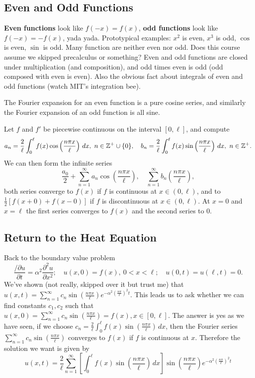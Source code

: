 \subsection{Even and Odd Functions}
\textbf{Even functions} look like $f(-x)=f(x)$, \textbf{odd functions} look like $f(-x)=-f(x)$, yada yada. Prototypical examples: $x^2$ is even, $x^3$ is odd, $\cos$ is even, $\sin$ is odd. Many function are neither even nor odd. Does this course assume we skipped precalculus or something? Even and odd functions are closed under multiplication (and composition), and odd times even is odd (odd composed with even is even). Also the obvious fact about integrals of even and odd functions (watch MIT's integration bee).
\begin{lemma}
    The Fourier expansion for an even function is a pure cosine series, and similarly the Fourier expansion of an odd function is all sine.
\end{lemma}
\begin{theorem}\label{2}
    Let $f$ and $f'$ be piecewise continuous on the interval $[0,\ell]$, and compute  \[
        a_n =\frac{2}{\ell}\int_{0}^{\ell} f(x) \cos \left( \frac{n\pi x}{\ell} \right)  \, dx, \ n\in \mathbb{Z}^+\cup \{0\}, \quad b_n =\frac{2}{\ell}\int_{0}^{\ell} f(x) \sin\left( \frac{n\pi x}{\ell} \right)  \, dx, \ n\in \mathbb{Z}^+.
    \] We can then form the infinite series \[
    \frac{a_0}{2}+\sum_{n=1}^{\infty} a_n \cos\left( \frac{n\pi x}{\ell} \right) ,\quad \sum_{n=1}^{\infty} b_n  \left( \frac{n\pi x}{\ell} \right) ,
\] both series converge to $f(x)$ if $f$ is continuous at $x\in (0,\ell)$, and to $\frac{1}{2}\left[ f(x+0)+f(x-0) \right] $ if $f$ is discontinuous at $x\in (0,\ell)$. At $x=0$ and $x=\ell$ the first series converges to $f(x)$ and the second series to 0.
\end{theorem}

\subsection{Return to the Heat Equation}
Back to the boundary value problem \[
    \frac{/\partial u}{\partial t }= \alpha ^2 \frac{\partial ^2 u }{\partial x^2}; \quad u(x,0)=f(x), \ 0<x<\ell; \quad u(0,t)=u(\ell, t)=0.
\] We've shown (not really, skipped over it but trust me) that $u(x,t)=\sum_{n=1}^{\infty} c_n \sin \left( \frac{n\pi x}{\ell} \right) e^{-\alpha ^2 \left( \frac{n\pi}{\ell} \right) ^2t}$. This leads us to ask whether we can find constants $c_1,c_2$ such that $u(x,0)=\sum_{n=1}^{\infty} c_n  \sin \left( \frac{n\pi x}{\ell} \right) =f(x), x\in [0,\ell]$. The answer is yes as we have seen, if we choose $c_n =\frac{2}{\ell}\int_{0}^{\ell} f(x) \sin \left( \frac{n\pi x}{\ell} \right)  \, dx$, then the Fourier series $\sum_{n=1}^{\infty} c_n \sin \left( \frac{n\pi x}{\ell} \right) $ converges to $f(x)$ if $f$ is continuous at $x.$ Therefore the solution we want is given by \[
u(x,t)=\frac{2}{\ell}\sum_{n=1}^{\infty} \left[ \int_{0}^{\ell} f(x) \sin\left( \frac{n\pi x}{\ell} \right)  \, dx \right] \sin \left( \frac{n\pi x}{\ell} \right) e^{-\alpha ^2 \left( \frac{n\pi}{\ell} \right) ^2t}
\] 
\newpage
